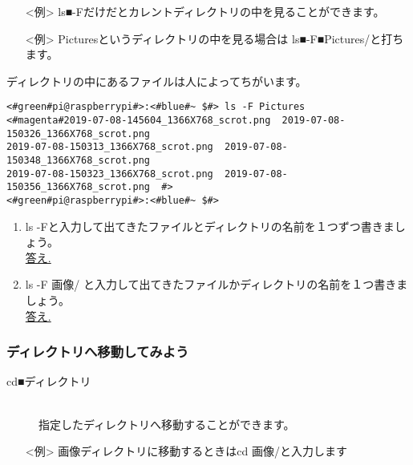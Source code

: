 \begin{itemize}
\item[<例>] ls■-Fだけだとカレントディレクトリの中を見ることができます。 
\item[<例>] Picturesというディレクトリの中を見る場合は ls■-F■Pictures/と打ちます。 
\end{itemize}

ディレクトリの中にあるファイルは人によってちがいます。
\begin{lstlisting}[caption=ls -F Pictures/コマンドの例,label=lsFPicttest]
<#green#pi@raspberrypi#>:<#blue#~ $#> ls -F Pictures
<#magenta#2019-07-08-145604_1366X768_scrot.png  2019-07-08-150326_1366X768_scrot.png  
2019-07-08-150313_1366X768_scrot.png  2019-07-08-150348_1366X768_scrot.png  
2019-07-08-150323_1366X768_scrot.png  2019-07-08-150356_1366X768_scrot.png  #>
<#green#pi@raspberrypi#>:<#blue#~ $#> 
\end{lstlisting}

\begin{tcolorbox}[caption=\useOmetoi]
\begin{enumerate}
\item ls -Fと入力して出てきたファイルとディレクトリの名前を１つずつ書きましょう。\\
\underline{答え.\hspace{0.8\linewidth}}
\item ls -F 画像/ と入力して出てきたファイルかディレクトリの名前を１つ書きましょう。\\
\underline{答え.\hspace{0.8\linewidth}}
\end{enumerate}

\end{tcolorbox}

\subsubsection{ディレクトリへ移動してみよう}
\begin{description}
\item[cd■ディレクトリ]\mbox{}\\
指定したディレクトリへ移動することができます。
\end{description}
\begin{itemize}
\item[<例>] 画像ディレクトリに移動するときはcd 画像/と入力します
\end{itemize}

